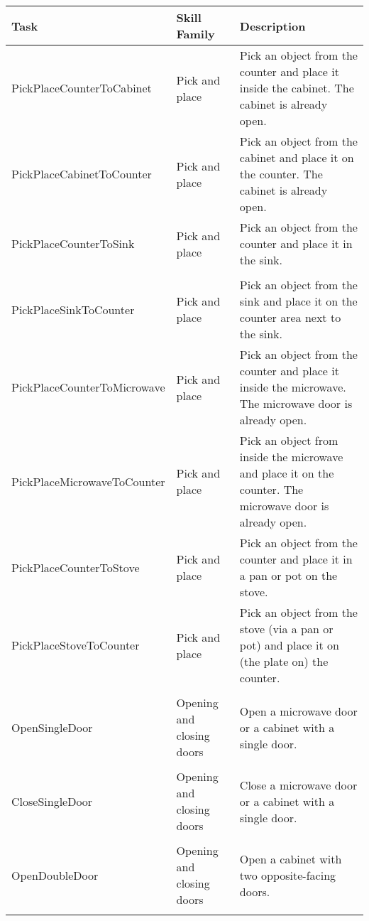 \begin{table}[t!]
\renewcommand{\arraystretch}{1.3}
\setlength{\aboverulesep}{0pt}
\setlength{\belowrulesep}{0pt}
\small
    \centering
    \begin{tabularx}{\textwidth}{l l X}
        \toprule
        \textbf{Task}              & \textbf{Skill Family} & \textbf{Description} \\ \hline
        PickPlaceCounterToCabinet   & Pick and place & Pick an object from the counter and place it inside the cabinet. The cabinet is already open. \\ 
        PickPlaceCabinetToCounter   & Pick and place & Pick an object from the cabinet and place it on the counter. The cabinet is already open. \\ 
        PickPlaceCounterToSink      & Pick and place & Pick an object from the counter and place it in the sink. \\\\ 
        PickPlaceSinkToCounter      & Pick and place & Pick an object from the sink and place it on the counter area next to the sink. \\ 
        PickPlaceCounterToMicrowave & Pick and place & Pick an object from the counter and place it inside the microwave. The microwave door is already open. \\ 
        PickPlaceMicrowaveToCounter & Pick and place & Pick an object from inside the microwave and place it on the counter. The microwave door is already open. \\ 
        PickPlaceCounterToStove     & Pick and place & Pick an object from the counter and place it in a pan or pot on the stove. \\ 
        PickPlaceStoveToCounter     & Pick and place & Pick an object from the stove (via a pan or pot) and place it on (the plate on) the counter. \\ \hline
        \\
        OpenSingleDoor              & Opening and closing doors & Open a microwave door or a cabinet with a single door. \\\\
        CloseSingleDoor             & Opening and closing doors & Close a microwave door or a cabinet with a single door. \\\\
        OpenDoubleDoor              & Opening and closing doors & Open a cabinet with two opposite-facing doors. \\ \\

\end{tabularx}
\end{table}
